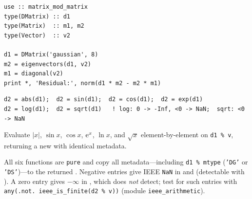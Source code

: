 \lstset{language=[95]Fortran}
\begin{lstlisting}
use :: matrix_mod_matrix
type(DMatrix) :: d1
type(Matrix)  :: m1, m2
type(Vector)  :: v2

d1 = DMatrix('gaussian', 8)
m2 = eigenvectors(d1, v2)
m1 = diagonal(v2)
print *, 'Residual:', norm(d1 * m2 - m2 * m1)
\end{lstlisting}



\lstset{language=[95]Fortran}
\begin{lstlisting}
d2 = abs(d1);  d2 = sin(d1);  d2 = cos(d1);  d2 = exp(d1)
d2 = log(d1);  d2 = sqrt(d1)   ! log: 0 -> -Inf, <0 -> NaN;  sqrt: <0 -> NaN
\end{lstlisting}

Evaluate $|x|$, $\sin x$, $\cos x$, ${\rm e}^{x}$, $\ln x$, and $\sqrt{x}$ element-by-element on \texttt{d1 \% v}, returning a new  with identical metadata.

All six functions are \texttt{pure} and copy all metadata---including \texttt{d1 \% mtype} (\texttt{'DG'} or \texttt{'DS'})---to the returned . Negative entries give IEEE \texttt{NaN} in  and  (detectable with ). A zero entry gives $-\infty$ in , which  does \emph{not} detect; test for such entries with \texttt{any(.not.\ ieee\_is\_finite(d2 \% v))} (module \texttt{ieee\_arithmetic}).

\begin{description}[leftmargin=2.2cm, style=nextline]
\end{description}

